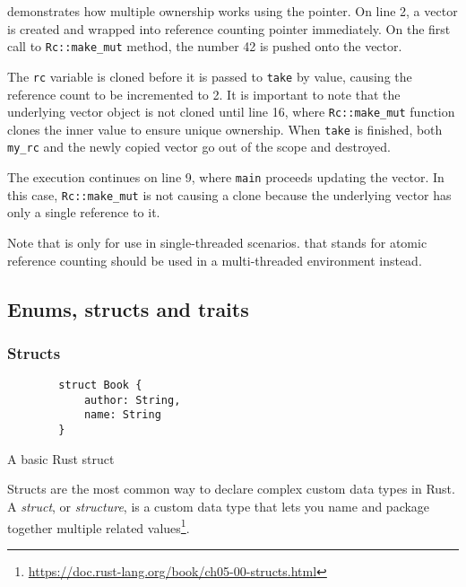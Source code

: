  demonstrates how multiple ownership works using the  pointer. On line 2, a vector is created and wrapped into reference counting pointer immediately. On the first call to \texttt{Rc::make_mut} method, the number 42 is pushed onto the vector.

The \texttt{rc} variable is cloned before it is passed to \texttt{take} by value, causing the reference count to be incremented to 2. It is important to note that the underlying vector object is not cloned until line 16, where \texttt{Rc::make_mut} function clones the inner value to ensure unique ownership. When \texttt{take} is finished, both \texttt{my_rc} and the newly copied vector go out of the scope and destroyed.

The execution continues on line 9, where \texttt{main} proceeds updating the vector. In this case, \texttt{Rc::make_mut} is not causing a clone because the underlying vector has only a single reference to it.

Note that  is only for use in single-threaded scenarios.  that stands for atomic reference counting should be used in a multi-threaded environment instead.

\subsection{Enums, structs and traits}
\label{sec:enums-structs-traits}

\subsubsection*{Structs}

\begin{listing}[!htbp]

    \centering
    \begin{verbatim}
        struct Book {
            author: String,
            name: String
        }
    \end{verbatim}

    \caption{A basic Rust struct}
    \label{lst:struct}
\end{listing}

Structs are the most common way to declare complex custom data types in Rust. A \emph{struct}, or \emph{structure}, is a custom data type that lets you name and package together multiple related values\footnote{\url{https://doc.rust-lang.org/book/ch05-00-structs.html}}.


